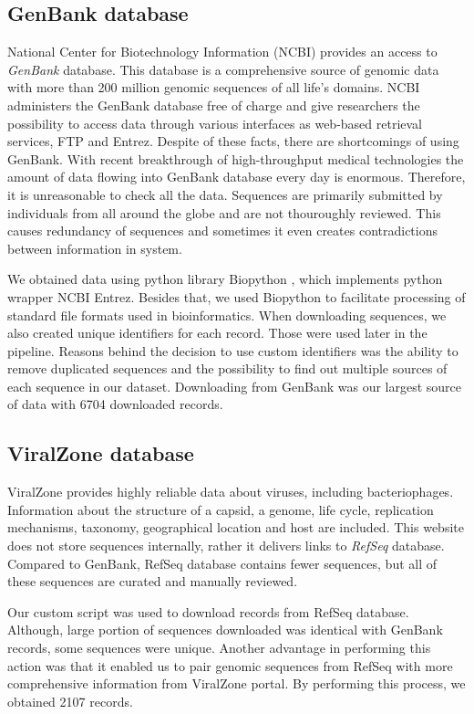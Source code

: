 \subsection{GenBank database}
National Center for Biotechnology Information (NCBI) provides an access to \emph{GenBank}\cite{genbank} database.
This database is a comprehensive source of genomic data with more than 200 million genomic sequences of all life’s domains.
NCBI administers the GenBank database free of charge and give researchers the possibility to access data through various interfaces as web-based retrieval services, FTP and Entrez\cite{entrez}.
Despite of these facts, there are shortcomings of using GenBank.
With recent breakthrough of high-throughput medical technologies the amount of data flowing into GenBank database every day is enormous.
Therefore, it is unreasonable to check all the data.
Sequences are primarily submitted by individuals from all around the globe and are not thouroughly reviewed.
This causes redundancy of sequences and sometimes it even creates contradictions between information in system.

We obtained data using python library Biopython \cite{biopython}, which implements python wrapper NCBI Entrez.
Besides that, we used Biopython to facilitate  processing of standard file formats used in bioinformatics.
When downloading sequences, we also created unique identifiers for each record.
Those were used later in the pipeline.
Reasons behind the decision to use custom identifiers was the ability to remove duplicated sequences and the possibility to find out multiple sources of each sequence in our dataset.
Downloading from GenBank was our largest source of data with 6704 downloaded records.

\subsection{ViralZone database}
ViralZone provides highly reliable data about viruses, including bacteriophages.
Information about the structure of a capsid, a genome, life cycle, replication mechanisms, taxonomy, geographical location and host are included.
This website does not store sequences internally, rather it delivers links to \emph{RefSeq}\cite{refseq} database.
Compared to GenBank, RefSeq database contains fewer sequences, but all of these sequences are curated and manually reviewed.

Our custom script was used to download records from RefSeq database.
Although, large portion of sequences downloaded was identical with GenBank records, some sequences were unique.
Another advantage in performing this action was that it enabled us to pair genomic sequences from RefSeq with more comprehensive information from ViralZone portal.
By performing this process, we obtained 2107 records.

